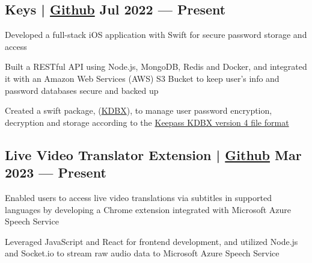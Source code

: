 
\subsection{{Keys | \href{https://github.com/jerikjakobsen/keys}{Github} \hfill Jul 2022 --- Present}}
\begin{zitemize}
\item Developed a full-stack iOS application with Swift for secure password storage and access
\item Built a RESTful API using Node.js, MongoDB, Redis and Docker, and integrated it with an Amazon Web Services (AWS) S3 Bucket to keep user's info and password databases secure and backed up
\item Created a swift package, (\href{https://github.com/jerikjakobsen/kdbx}{KDBX}), to manage user password encryption, decryption and storage according to the  \href{https://keepass.info/help/kb/kdbx_4.html}{Keepass KDBX version 4 file format}
\end{zitemize}

\subsection{{Live Video Translator Extension | \href{https://github.com/jerikjakobsen/Translator-Extension}{Github} \hfill Mar 2023 --- Present}}
\begin{zitemize}
\item Enabled users to access live video translations via subtitles in supported languages by developing a Chrome extension integrated with Microsoft Azure Speech Service
\item Leveraged JavaScript and React for frontend development, and utilized Node.js and Socket.io to stream raw audio data to Microsoft Azure Speech Service
\end{zitemize}